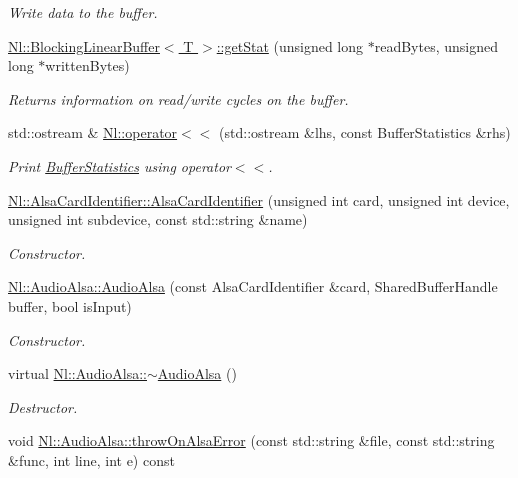 \begin{DoxyCompactItemize}
\begin{DoxyCompactList}\small\item\em Write data to the buffer. \end{DoxyCompactList}\item 
\hyperlink{group__Audio_gabdd2b325cd5a2383579737299b4b3aca}{Nl\-::\-Blocking\-Linear\-Buffer$<$ T $>$\-::get\-Stat} (unsigned long $\ast$read\-Bytes, unsigned long $\ast$written\-Bytes)
\begin{DoxyCompactList}\small\item\em Returns information on read/write cycles on the buffer. \end{DoxyCompactList}\item 
std\-::ostream \& \hyperlink{group__Audio_ga6579e7baf04a5e2038a7d77b8f2552ca}{Nl\-::operator$<$$<$} (std\-::ostream \&lhs, const Buffer\-Statistics \&rhs)
\begin{DoxyCompactList}\small\item\em Print \hyperlink{structNl_1_1BufferStatistics}{Buffer\-Statistics} using operator$<$$<$. \end{DoxyCompactList}\item 
\hyperlink{group__Audio_ga3e419719a775f61b40481f3f514f1d36}{Nl\-::\-Alsa\-Card\-Identifier\-::\-Alsa\-Card\-Identifier} (unsigned int card, unsigned int device, unsigned int subdevice, const std\-::string \&name)
\begin{DoxyCompactList}\small\item\em Constructor. \end{DoxyCompactList}\item 
\hyperlink{group__Audio_gaa7d5473de50c4d4a67a6c8c153d88c03}{Nl\-::\-Audio\-Alsa\-::\-Audio\-Alsa} (const Alsa\-Card\-Identifier \&card, Shared\-Buffer\-Handle buffer, bool is\-Input)
\begin{DoxyCompactList}\small\item\em Constructor. \end{DoxyCompactList}\item 
virtual \hyperlink{group__Audio_ga0bdbff0289e06c0fd0ccbe4a570fc286}{Nl\-::\-Audio\-Alsa\-::$\sim$\-Audio\-Alsa} ()
\begin{DoxyCompactList}\small\item\em Destructor. \end{DoxyCompactList}\item 
void \hyperlink{group__Audio_ga49001b5030e29d798858025458a0d8ad}{Nl\-::\-Audio\-Alsa\-::throw\-On\-Alsa\-Error} (const std\-::string \&file, const std\-::string \&func, int line, int e) const 

\end{DoxyCompactItemize}
